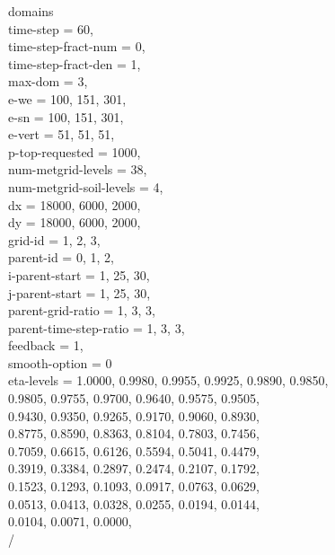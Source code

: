 \documentclass[a4paper,12pt]{article}
\numberwithin{equation}{section} %
\begin{document}
 domains\\
 time-step                           = 60,\\
 time-step-fract-num                 = 0,\\
 time-step-fract-den                 = 1,\\
 max-dom                             = 3,\\
 e-we                                = 100,    151,   301,\\
 e-sn                                = 100,    151,   301,\\
 e-vert                              = 51,    51,    51,\\
 p-top-requested                     = 1000,\\
 num-metgrid-levels                  = 38,\\
 num-metgrid-soil-levels             = 4,\\
 dx                                  = 18000, 6000,  2000,\\
 dy                                  = 18000, 6000,  2000,\\
 grid-id                             = 1,     2,     3,\\
 parent-id                           = 0,     1,     2,\\
 i-parent-start                      = 1,     25,    30,\\
 j-parent-start                      = 1,     25,    30,\\
 parent-grid-ratio                   = 1,     3,     3,\\
 parent-time-step-ratio              = 1,     3,     3,\\
 feedback                            = 1,	\\
 smooth-option                       = 0\\
 eta-levels =   1.0000, 0.9980, 0.9955, 0.9925, 0.9890, 0.9850,\\
                0.9805, 0.9755, 0.9700, 0.9640, 0.9575, 0.9505,\\
                0.9430, 0.9350, 0.9265, 0.9170, 0.9060, 0.8930,\\
                0.8775, 0.8590, 0.8363, 0.8104, 0.7803, 0.7456,\\
                0.7059, 0.6615, 0.6126, 0.5594, 0.5041, 0.4479,\\
                0.3919, 0.3384, 0.2897, 0.2474, 0.2107, 0.1792,\\
                0.1523, 0.1293, 0.1093, 0.0917, 0.0763, 0.0629,\\
                0.0513, 0.0413, 0.0328, 0.0255, 0.0194, 0.0144,\\
                0.0104, 0.0071, 0.0000,\\
 /\\
\end{document}
